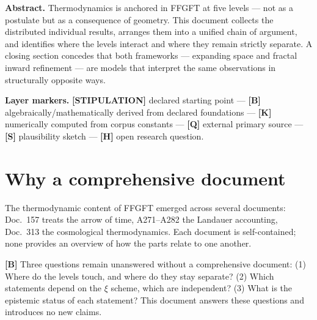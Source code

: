 
\providecommand{\qedsq}{\raisebox{0.03em}{\framebox[0.62em]{\rule{0pt}{0.42em}}}}

\begingroup\small\noindent
\textbf{Abstract.}
Thermodynamics is anchored in FFGFT at five levels --- not as a
postulate but as a consequence of geometry.
This document collects the distributed individual results, arranges
them into a unified chain of argument, and identifies where the levels
interact and where they remain strictly separate.
A closing section concedes that both frameworks --- expanding space and
fractal inward refinement --- are models that interpret the same
observations in structurally opposite ways.
\par\endgroup

\bigskip

\begingroup\small\noindent
\textbf{Layer markers.}
\textbf{[STIPULATION]} declared starting point ---
\textbf{[B]} algebraically/mathematically derived from declared foundations ---
\textbf{[K]} numerically computed from corpus constants ---
\textbf{[Q]} external primary source ---
\textbf{[S]} plausibility sketch ---
\textbf{[H]} open research question.
\par\endgroup

\bigskip

\section{Why a comprehensive document}

The thermodynamic content of FFGFT emerged across several documents:
Doc.~157 treats the arrow of time, A271--A282 the Landauer accounting,
Doc.~313 the cosmological thermodynamics.
Each document is self-contained; none provides an overview of how the
parts relate to one another.

\textbf{[B]} Three questions remain unanswered without a comprehensive
document:
(1) Where do the levels touch, and where do they stay separate?
(2) Which statements depend on the $\xi$ scheme, which are independent?
(3) What is the epistemic status of each statement?
This document answers these questions and introduces no new claims.

